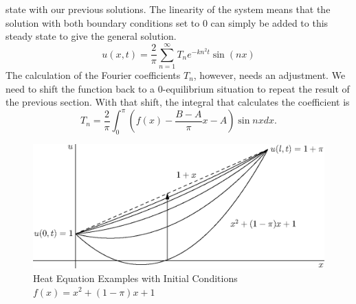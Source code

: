 \documentclass[fleqn,letterpaper]{report}
\begin{document}
state with our previous solutions. The linearity of the
system means that the solution with both boundary conditions
set to $0$ can simply be added to this steady state to give
the general solution.
\begin{equation*}
u(x,t) = \frac{2}{\pi} \sum_{n=1}^\infty T_n e^{-kn^2t} \sin (nx) 
\end{equation*}
The calculation of the Fourier coefficients $T_n$, however,
needs an adjustment. We need to shift the function
back to a 0-equilibrium situation to repeat the result of the
previous section. With that shift, the integral that
calculates the coefficient is 
\begin{equation*}
T_n = \frac{2}{\pi} \int_0^\pi \left( f(x) - \frac{B-A}{\pi} x
- A \right) \sin nx dx.
\end{equation*}

\begin{figure}[t]
\centering
\includegraphics[width=12cm]{figure44.eps}
\caption{Heat Equation Examples with Initial Conditions $f(x)
= x^2 + (1-\pi)x + 1$}
\label{figure-diffusion2}
\end{figure}
\end{document}

